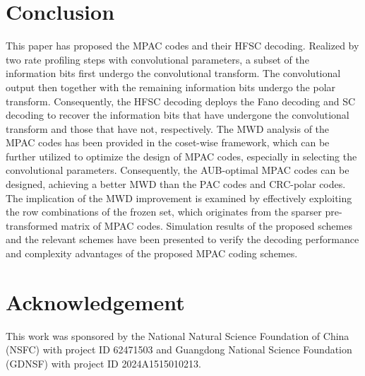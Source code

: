 \documentclass[12pt, draftclsnofoot, peerreview, onecolumn]{IEEEtran}
\theoremstyle{noparent}
\begin{document}
\section{Conclusion}
\label{sec7}
This paper has proposed the MPAC codes and their HFSC decoding. 
Realized by two rate profiling steps with convolutional parameters,
a subset of the information bits first undergo the convolutional transform. 
The convolutional output then together with the remaining information bits 
undergo the polar transform. 
Consequently, the HFSC decoding deploys the Fano decoding and SC decoding 
to recover the information bits that have undergone the convolutional transform and 
those that have not, respectively. 
The MWD analysis of the MPAC codes has been provided in the coset-wise framework, 
which can be further utilized to optimize the design of MPAC codes, 
especially in selecting the convolutional parameters. 
Consequently, the AUB-optimal MPAC codes can be designed, 
achieving a better MWD than the PAC codes and CRC-polar codes. 
The implication of the MWD improvement is examined by effectively exploiting the row combinations of the frozen set, which originates from the sparser pre-transformed matrix of MPAC codes. 
Simulation results of the proposed schemes and the relevant schemes 
have been presented to verify the decoding performance and complexity advantages 
of the proposed MPAC coding schemes.









\section*{Acknowledgement}
This work was sponsored by the National Natural Science
Foundation of China (NSFC) with project ID 62471503 
and Guangdong National Science Foundation (GDNSF) with project ID 2024A1515010213.


















































        
\end{document}

